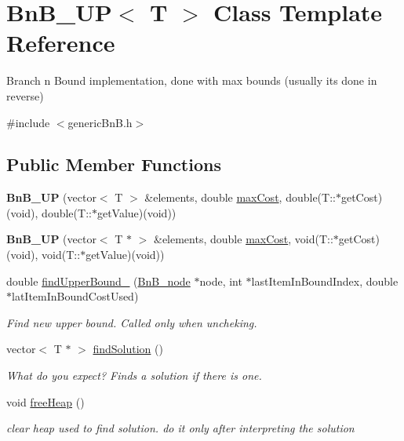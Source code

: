 \hypertarget{class_bn_b___u_p}{}\section{Bn\+B\+\_\+\+U\+P$<$ T $>$ Class Template Reference}
\label{class_bn_b___u_p}


Branch n Bound implementation, done with max bounds (usually it\textquotesingle{}s done in reverse)  




{\ttfamily \#include $<$generic\+Bn\+B.\+h$>$}

\subsection*{Public Member Functions}
\begin{DoxyCompactItemize}
\item 
\hypertarget{class_bn_b___u_p_a1906f95c4d3eb96568d6f314e2878808}{}{\bfseries Bn\+B\+\_\+\+U\+P} (vector$<$ T $>$ \&elements, double \hyperlink{class_bn_b___u_p_a0749a907c11c880f825fd0644a8a2bfd}{max\+Cost}, double(T\+::$\ast$get\+Cost)(void), double(T\+::$\ast$get\+Value)(void))\label{class_bn_b___u_p_a1906f95c4d3eb96568d6f314e2878808}

\item 
\hypertarget{class_bn_b___u_p_ae26455243268d49878421014d4bc1645}{}{\bfseries Bn\+B\+\_\+\+U\+P} (vector$<$ T $\ast$ $>$ \&elements, double \hyperlink{class_bn_b___u_p_a0749a907c11c880f825fd0644a8a2bfd}{max\+Cost}, void(T\+::$\ast$get\+Cost)(void), void(T\+::$\ast$get\+Value)(void))\label{class_bn_b___u_p_ae26455243268d49878421014d4bc1645}

\item 
double \hyperlink{class_bn_b___u_p_a52efbfa978fd9b6c43e50da878862d93}{find\+Upper\+Bound\+\_} (\hyperlink{class_bn_b__node}{Bn\+B\+\_\+node} $\ast$node, int $\ast$last\+Item\+In\+Bound\+Index, double $\ast$lat\+Item\+In\+Bound\+Cost\+Used)
\begin{DoxyCompactList}\small\item\em Find new upper bound. Called only when uncheking. \end{DoxyCompactList}\item 
vector$<$ T $\ast$ $>$ \hyperlink{class_bn_b___u_p_a18f7b192ac90dcf610c850f7ab10e365}{find\+Solution} ()
\begin{DoxyCompactList}\small\item\em What do you expect? Finds a solution if there is one. \end{DoxyCompactList}\item 
\hypertarget{class_bn_b___u_p_a2e70ca6c5bddb5467c7b45335922e9ae}{}void \hyperlink{class_bn_b___u_p_a2e70ca6c5bddb5467c7b45335922e9ae}{free\+Heap} ()\label{class_bn_b___u_p_a2e70ca6c5bddb5467c7b45335922e9ae}

\begin{DoxyCompactList}\small\item\em clear heap used to find solution. do it only after interpreting the solution \end{DoxyCompactList}\end{DoxyCompactItemize}
